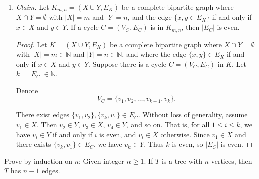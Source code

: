 \documentclass{article}
\newcommand{\N}{\mathbb{N}}
\theoremstyle{definition}
\begin{document}
\begin{solution}
\begin{enumerate}
\begin{proof}
For all possible cases where the number of vertices with degree 1 is less than 3, we arrive at a contradiction. Thus our assumption is false: $T$ does have at least 3 vertices with degree 1.
\end{proof}
\item\textit{Claim. }Let $K_{m,n}=(X\cup Y,E_K)$ be a complete bipartite graph where $X\cap Y=\emptyset$ with $|X|=m$ and $|Y|=n$, and the edge $\{x,y\in E_K\}$ if and only if $x\in X$ and $y\in Y$. If a cycle $C=(V_C,E_C)$ is in $K_{m,n}$, then $|E_C|$ is even.
\begin{proof}
Let $K=(X\cup Y,E_K)$ be a complete bipartite graph where $X\cap Y=\emptyset$ with $|X|=m\in\N$ and $|Y|=n\in\N$, and where the edge $\{x,y\}\in E_K$ if and only if $x\in X$ and $y\in Y$. Suppose there is a cycle $C=(V_C,E_C)$ in $K$. Let $k=|E_C|\in\N$.

Denote \[V_C=\{v_1,v_2,\dots,v_{k-1},v_{k}\}.\]

There exist edges $\{v_1,v_2\},\{v_k,v_1\}\in E_C$. Without loss of generality, assume $v_1\in X$. Then $v_2\in Y$, $v_3\in X$, $v_4\in Y$, and so on. That is, for all $1\leq i\leq k$, we have $v_i\in Y$ if and only if $i$ is even, and $v_i\in X$ otherwise. Since $v_1\in X$ and there exists $\{v_k,v_1\}\in E_C$, we have $v_k\in Y$. Thus $k$ is even, so $|E_C|$ is even.
\end{proof}
\end{enumerate}
\end{solution}
\begin{question}
    Prove by induction on $n$: Given integer $n\geq 1$. If  $T$ is a tree with $n$ vertices, then $T$ has $n-1$ edges. 
\end{question}
\end{document}

